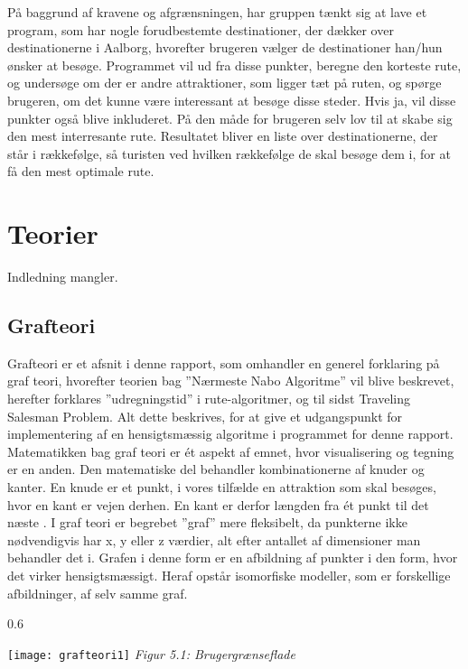 På baggrund af kravene og afgrænsningen, har gruppen tænkt sig at lave et program, som har nogle forudbestemte destinationer, der dækker over destinationerne i Aalborg, hvorefter brugeren vælger de destinationer han/hun ønsker at besøge. Programmet vil ud fra disse punkter, beregne den korteste rute, og undersøge om der er andre attraktioner, som ligger tæt på ruten, og spørge brugeren, om det kunne være interessant at besøge disse steder. Hvis ja, vil disse punkter også blive inkluderet. På den måde for brugeren selv lov til at skabe sig den mest interresante rute. Resultatet bliver en liste over destinationerne, der står i rækkefølge, så turisten ved hvilken rækkefølge de skal besøge dem i, for at få den mest optimale rute.

\section{Teorier}
Indledning mangler.

\subsection{Grafteori}
Grafteori er et afsnit i denne rapport, som omhandler en generel forklaring på graf teori, hvorefter teorien bag ”Nærmeste Nabo Algoritme” vil blive beskrevet, herefter forklares ”udregningstid” i rute-algoritmer, og til sidst Traveling Salesman Problem. Alt dette beskrives, for at give et udgangspunkt for implementering af en hensigtsmæssig algoritme i programmet for denne rapport.\newline
Matematikken bag graf teori er ét aspekt af emnet, hvor visualisering og tegning er en anden. Den matematiske del behandler kombinationerne af knuder og kanter. En knude er et punkt, i vores tilfælde en attraktion som skal besøges, hvor en kant er vejen derhen. En kant er derfor længden fra ét punkt til det næste \citep{GraphTheory}.
I graf teori er begrebet ”graf” mere fleksibelt, da punkterne ikke nødvendigvis har x, y eller z værdier, alt efter antallet af dimensioner man behandler det i. Grafen i denne form er en afbildning af punkter i den form, hvor det virker hensigtsmæssigt. Heraf opstår isomorfiske modeller, som er forskellige afbildninger, af selv samme graf. 

\begin{wrapfigure}{}{0.6\textwidth}
  \vspace{-20pt}
  \begin{center}
    \texttt{[image: grafteori1]} \newline
    \textit{Figur 5.1: Brugergrænseflade}\newline
  \end{center}
  \vspace{-20pt}
  \vspace{-20pt}
\end{wrapfigure}

